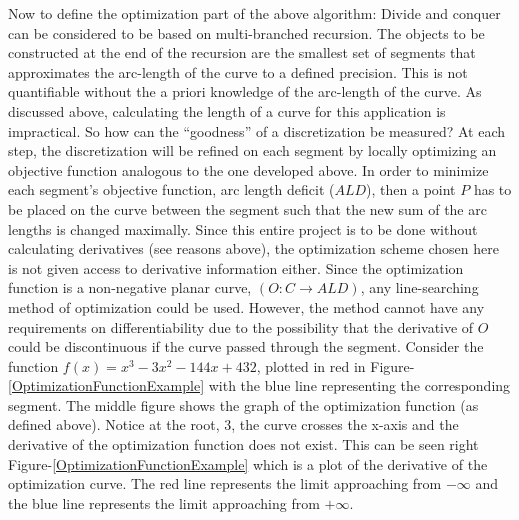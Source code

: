 Now to define the optimization part of the above algorithm:  Divide and conquer can be considered to be based on multi-branched recursion.  The objects to be constructed at the end of the recursion are the smallest set of segments that approximates the arc-length of the curve to a defined precision.  This is not quantifiable without the a priori knowledge of the arc-length of the curve.  As discussed above, calculating the length of a curve for this application is impractical.  So how can the ``goodness'' of a discretization be measured?  At each step, the discretization will be refined on each segment by locally optimizing an objective function analogous to the one developed above.  In order to minimize each segment’s objective function, arc length deficit ($ALD$), then a point $P$ has to be placed on the curve between the segment such that the new sum of the arc lengths is changed maximally.  Since this entire project is to be done without calculating derivatives (see reasons above), the optimization scheme chosen here is not given access to derivative information either.  Since the optimization function is a non-negative planar curve, $(O: C \rightarrow ALD)$, any line-searching method of optimization could be used.  However, the method cannot have any requirements on differentiability due to the possibility that the derivative of $O$ could be discontinuous if the curve passed through the segment.  Consider the function $f(x)=x^3-3x^2-144x+432$, plotted in red in Figure-\ref{OptimizationFunctionExample} with the blue line representing the corresponding segment.  The middle figure shows the graph of the optimization function (as defined above).  Notice at the root, 3, the curve crosses the x-axis and the derivative of the optimization function does not exist.  This can be seen right Figure-\ref{OptimizationFunctionExample} which is a plot of the derivative of the optimization curve.  The red line represents the limit approaching from $-\infty$ and the blue line represents the limit approaching from $+\infty$.

